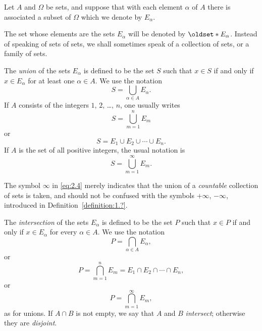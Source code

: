 \begin{definition}
    Let \(A\) and \(\Omega\) be sets, and suppose that with each element \(\alpha\) of \(A\) there is associated a subset of \(\Omega\) which we denote by \(E_\alpha\).
    
    The set whose elements are the sets \(E_\alpha\) will be denoted by \(\set{E_\alpha}\). Instead of speaking of sets of sets, we shall sometimes speak of a collection of sets, or a family of sets.
    
    The \emph{union} of the sets \(E_\alpha\) is defined to be the set \(S\) such that \(x\in S\) if and only if \(x\in E_\alpha\) for at least one \(\alpha\in A\). We use the notation
    \begin{equation}
        S=\bigcup_{\alpha\in A}E_\alpha.
    \end{equation}
    If \(A\) consists of the integers \(1\), \(2\), \ldots, \(n\), one usually writes
    \begin{equation}
        S=\bigcup_{m=1}^nE_m
    \end{equation}
    or
    \begin{equation}
        S=E_1\cup E_2\cup\cdots\cup E_n.\label{eq:2.3}
    \end{equation}
    If \(A\) is the set of all positive integers, the usual notation is
    \begin{equation}
        S=\bigcup_{m=1}^\infty E_m.\label{eq:2.4}
    \end{equation}

    The symbol \(\infty\) in \eqref{eq:2.4} merely indicates that the union of a \emph{countable} collection of sets is taken, and should not be confused with the symbols \(+\infty\), \(-\infty\), introduced in Definition~\ref{definition:1.?}.
    
    The \emph{intersection} of the sets \(E_\alpha\) is defined to be the set \(P\) such that \(x\in P\) if and only if \(x\in E_\alpha\) for every \(\alpha\in A\). We use the notation
    \begin{equation}
        P=\bigcap_{\alpha\in A}E_\alpha,
    \end{equation}
    or
    \begin{equation}
        P=\bigcap_{m=1}^nE_m=E_1\cap E_2\cap\cdots\cap E_n,\label{eq:2.6}
    \end{equation}
    or
    \begin{equation}
        P=\bigcap_{m=1}^\infty E_m,
    \end{equation}
    as for unions. If \(A\cap B\) is not empty, we say that \(A\) and \(B\) \emph{intersect}; otherwise they are \emph{disjoint}.
\end{definition}

